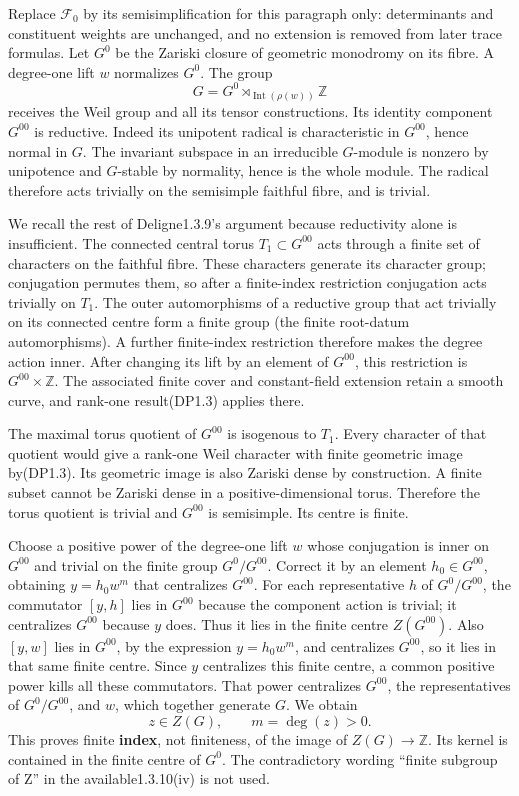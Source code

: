 \documentclass[
]{report}
\begin{document}
Replace \(\mathcal F_0\) by its semisimplification for this paragraph
only: determinants and constituent weights are unchanged, and no
extension is removed from later trace formulas. Let \(G^0\) be the
Zariski closure of geometric monodromy on its fibre. A degree-one lift
\(w\) normalizes \(G^0\). The group \[
G=G^0\rtimes_{\operatorname{Int}(\rho(w))}\mathbb Z
\tag{DP2.1}
\] receives the Weil group and all its tensor constructions. Its
identity component \(G^{00}\) is reductive. Indeed its unipotent radical
is characteristic in \(G^{00}\), hence normal in \(G\). The invariant
subspace in an irreducible \(G\)-module is nonzero by unipotence and
\(G\)-stable by normality, hence is the whole module. The radical
therefore acts trivially on the semisimple faithful fibre, and is
trivial.

We recall the rest of Deligne1.3.9's argument because reductivity alone
is insufficient. The connected central torus \(T_1\subset G^{00}\) acts
through a finite set of characters on the faithful fibre. These
characters generate its character group; conjugation permutes them, so
after a finite-index restriction conjugation acts trivially on \(T_1\).
The outer automorphisms of a reductive group that act trivially on its
connected centre form a finite group (the finite root-datum
automorphisms). A further finite-index restriction therefore makes the
degree action inner. After changing its lift by an element of
\(G^{00}\), this restriction is \(G^{00}\times\mathbb Z\). The
associated finite cover and constant-field extension retain a smooth
curve, and rank-one result(DP1.3) applies there.

The maximal torus quotient of \(G^{00}\) is isogenous to \(T_1\). Every
character of that quotient would give a rank-one Weil character with
finite geometric image by(DP1.3). Its geometric image is also Zariski
dense by construction. A finite subset cannot be Zariski dense in a
positive-dimensional torus. Therefore the torus quotient is trivial and
\(G^{00}\) is semisimple. Its centre is finite.

Choose a positive power of the degree-one lift \(w\) whose conjugation
is inner on \(G^{00}\) and trivial on the finite group \(G^0/G^{00}\).
Correct it by an element \(h_0\in G^{00}\), obtaining \(y=h_0w^m\) that
centralizes \(G^{00}\). For each representative \(h\) of \(G^0/G^{00}\),
the commutator \([y,h]\) lies in \(G^{00}\) because the component action
is trivial; it centralizes \(G^{00}\) because \(y\) does. Thus it lies
in the finite centre \(Z(G^{00})\). Also \([y,w]\) lies in \(G^{00}\),
by the expression \(y=h_0w^m\), and centralizes \(G^{00}\), so it lies
in that same finite centre. Since \(y\) centralizes this finite centre,
a common positive power kills all these commutators. That power
centralizes \(G^{00}\), the representatives of \(G^0/G^{00}\), and
\(w\), which together generate \(G\). We obtain \[
z\in Z(G),\qquad m=\deg(z)>0.
\tag{DP2.2}
\] This proves finite \textbf{index}, not finiteness, of the image of
\(Z(G)\to\mathbb Z\). Its kernel is contained in the finite centre of
\(G^0\). The contradictory wording ``finite subgroup of Z'' in the
available1.3.10(iv) is not used.
\end{document}
